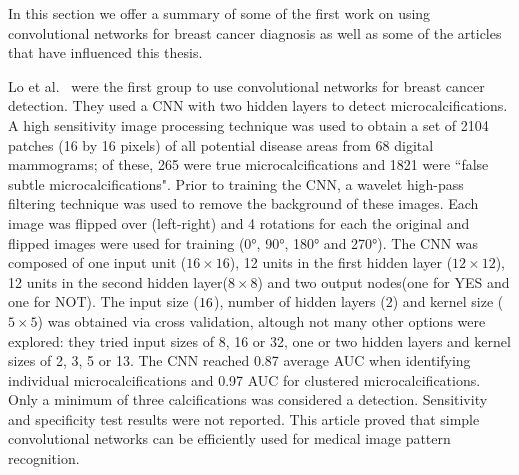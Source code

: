 In this section we offer a summary of some of the first work on using convolutional networks for breast cancer diagnosis as well as some of the articles that have influenced this thesis.

Lo et al.~\cite{Lo1995} were the first group to use convolutional networks for breast cancer detection. They used a CNN with two hidden layers to detect microcalcifications. A high sensitivity image processing technique was used to obtain a set of 2104 patches (16 by 16 pixels) of all potential disease areas from 68 digital mammograms; of these, 265 were true microcalcifications and 1821 were ``false subtle microcalcifications". Prior to training the CNN, a wavelet high-pass filtering technique was used to remove the background of these images. Each image was flipped over (left-right) and 4 rotations for each the original and flipped images were used for training (0°, 90°, 180° and 270°). The CNN was composed of one input unit ($16\times16$), 12 units in the first hidden layer ($12\times12$), 12 units in the second hidden layer($8\times 8$) and two output nodes(one for YES and one for NOT). The input size ($16\time16$), number of hidden layers ($2$) and kernel size ($5\times5$) was obtained via cross validation, altough not many other options were explored: they tried input sizes of 8, 16 or 32, one or two hidden layers and kernel sizes of 2, 3, 5 or 13. The CNN reached 0.87 average AUC when identifying individual microcalcifications and 0.97 AUC for clustered microcalcifications. Only a minimum of three calcifications was considered a detection. Sensitivity and specificity test results were not reported. This article proved that simple convolutional networks can be efficiently used for medical image pattern recognition.



